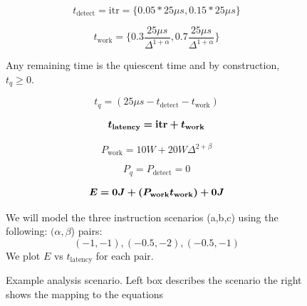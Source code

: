\begin{figure}
{{\begin{minipage}{18em}
$$t_{\text{detect}} = \text{itr} = \{0.05*25{\mu}s, 0.15*25{\mu}s\}$$




$$t_{\text{work}} = \{0.3\frac{25{\mu}s}{\Delta^{1+\alpha}}, 0.7\frac{25{\mu}s}{\Delta^{1+\alpha}}\}$$



Any remaining time is the quiescent time and by construction, $t_q \geq 0$.

$$t_q = (25{\mu}s - t_{\text{detect}} - t_{\text{work}})$$


\begin{equation}
\bm{t_{\text{\bf{latency}}} = \text{\bf{itr}} + t_{\text{\bf{work}}}}	
\end{equation}


$$P_{\text{work}} = 10W + 20W \Delta^{2+\beta}$$


$$P_q = P_{\text{detect}} = 0$$



\begin{equation}
\bm{E = 0J + (P_{\text{\bf{work}}} t_{\text{\bf{work}}}) + 0J}	
\end{equation}

We will model the three instruction scenarios (a,b,c) using the following: $(\alpha,\beta$) pairs:
$$(-1,-1), (-0.5,-2), (-0.5, -1) $$
We plot $E$ vs $t_{\text{latency}}$ for each pair.

\end{minipage}
}
}
\caption[]{Example analysis scenario. Left box describes the scenario the right shows the mapping to the equations }
\label{fig:simdesc}
\end{figure}

